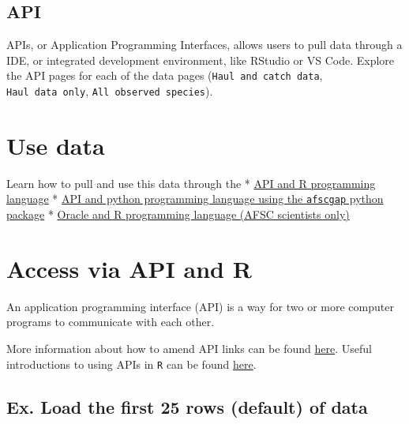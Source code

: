 \documentclass[
  letterpaper,
  oneside,
  open=any]{scrbook}
\begin{document}
\hypertarget{api}{%
\section{API}\label{api}}

APIs, or Application Programming Interfaces, allows users to pull data
through a IDE, or integrated development environment, like RStudio or VS
Code. Explore the API pages for each of the data pages
(\texttt{Haul\ and\ catch\ data}, \texttt{Haul\ data\ only},
\texttt{All\ observed\ species}).

\hypertarget{use-data}{%
\chapter{Use data}\label{use-data}}

Learn how to pull and use this data through the *
\href{https://afsc-gap-products.github.io/gap_products/content/foss-api-r.html}{API
and R programming language} *
\href{https://afsc-gap-products.github.io/gap_products/content/foss-api-py.html}{API
and python programming language using the \texttt{afscgap} python
package} *
\href{https://afsc-gap-products.github.io/gap_products/content/foss-oracle-r.html}{Oracle
and R programming language (AFSC scientists only)}

\hypertarget{access-via-api-and-r}{%
\chapter{Access via API and R}\label{access-via-api-and-r}}

An application programming interface (API) is a way for two or more
computer programs to communicate with each other.

More information about how to amend API links can be found
\href{https://docs.oracle.com/en/database/oracle/oracle-rest-data-services/22.3/books.html\#AELIG90103/}{here}.
Useful introductions to using APIs in \texttt{R} can be found
\href{https://www.dataquest.io/blog/r-api-tutorial/}{here}.

\hypertarget{ex.-load-the-first-25-rows-default-of-data}{%
\section{Ex. Load the first 25 rows (default) of
data}\label{ex.-load-the-first-25-rows-default-of-data}}
\end{document}
